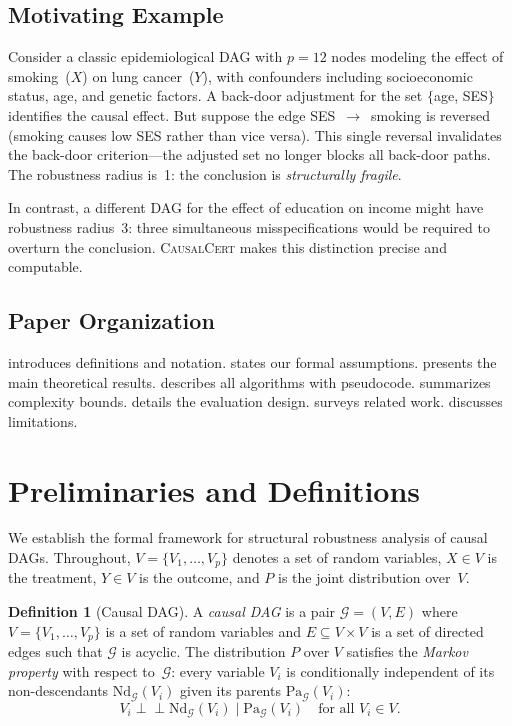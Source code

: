 \documentclass[11pt,a4paper]{article}
\theoremstyle{definition}
\newtheorem{definition}[theorem]{Definition}
\theoremstyle{remark}
\newcommand{\CI}{\perp\!\!\!\perp}
\newcommand{\DAG}{\mathcal{G}}
\newcommand{\Pa}{\mathrm{Pa}}
\newcommand{\Nd}{\mathrm{Nd}}
\begin{document}
\subsection{Motivating Example}

Consider a classic epidemiological DAG with $p = 12$ nodes modeling the effect of
smoking~($X$) on lung cancer~($Y$), with confounders including socioeconomic status,
age, and genetic factors. A back-door adjustment for the set $\{$age, SES$\}$ identifies
the causal effect. But suppose the edge SES~$\to$~smoking is reversed (smoking causes
low SES rather than vice versa). This single reversal invalidates the back-door
criterion---the adjusted set no longer blocks all back-door paths. The robustness radius
is~1: the conclusion is \emph{structurally fragile}.

In contrast, a different DAG for the effect of education on income might have robustness
radius~3: three simultaneous misspecifications would be required to overturn the
conclusion. \textsc{CausalCert} makes this distinction precise and computable.

\subsection{Paper Organization}

 introduces definitions and notation.
 states our formal assumptions.
 presents the main theoretical results.
 describes all algorithms with pseudocode.
 summarizes complexity bounds.
 details the evaluation design.
 surveys related work.
 discusses limitations.


\section{Preliminaries and Definitions}\label{sec:prelim}

We establish the formal framework for structural robustness analysis of causal DAGs.
Throughout, $V = \{V_1, \ldots, V_p\}$ denotes a set of random variables, $X \in V$ is
the treatment, $Y \in V$ is the outcome, and $P$ is the joint distribution over~$V$.

\begin{definition}[Causal DAG]\label{def:dag}
A \emph{causal DAG} is a pair $\DAG = (V, E)$ where $V = \{V_1, \ldots, V_p\}$ is a
set of random variables and $E \subseteq V \times V$ is a set of directed edges such
that $\DAG$ is acyclic. The distribution $P$ over $V$ satisfies the \emph{Markov
property} with respect to~$\DAG$: every variable $V_i$ is conditionally independent of
its non-descendants $\Nd_\DAG(V_i)$ given its parents $\Pa_\DAG(V_i)$:
\[
  V_i \CI \Nd_\DAG(V_i) \mid \Pa_\DAG(V_i) \quad \text{for all } V_i \in V.
\]
\end{definition}
\end{document}

